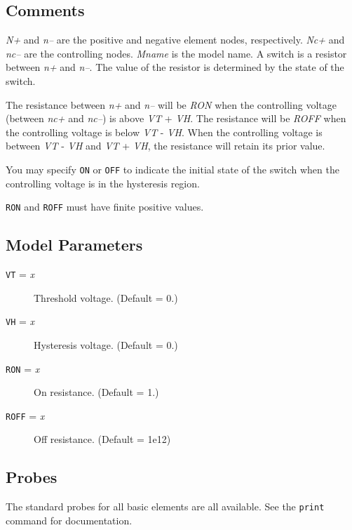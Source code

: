 \subsection{Comments}

{\it N+} and {\it n--} are the positive and negative element nodes,
respectively.  {\it Nc+} and {\it nc--} are the controlling nodes.
{\it Mname} is the model name.  A switch is a resistor between {\it
n+} and {\it n--}.  The value of the resistor is determined by the
state of the switch.

The resistance between {\it n+} and {\it n--} will be {\it RON}
when the controlling voltage (between {\it nc+} and {\it nc--}) is
above {\it VT} + {\it VH}.  The resistance will be {\it ROFF} when
the controlling voltage is below {\it VT} - {\it VH}.  When the
controlling voltage is between {\it VT} - {\it VH} and {\it VT} +
{\it VH}, the resistance will retain its prior value.

You may specify {\tt ON} or {\tt OFF} to indicate the initial state
of the switch when the controlling voltage is in the hysteresis
region.

{\tt RON} and {\tt ROFF} must have finite positive values.
\subsection{Model Parameters}

\begin{description}

\item[{\tt VT} = {\it x}] Threshold voltage.  (Default = 0.)

\item[{\tt VH} = {\it x}] Hysteresis voltage.  (Default = 0.)

\item[{\tt RON} = {\it x}] On resistance.  (Default = 1.)

\item[{\tt ROFF} = {\it x}] Off resistance.  (Default = 1e12)

\end{description}
\subsection{Probes}

The standard probes for all basic elements are all available.  See the
{\tt print} command for documentation.

